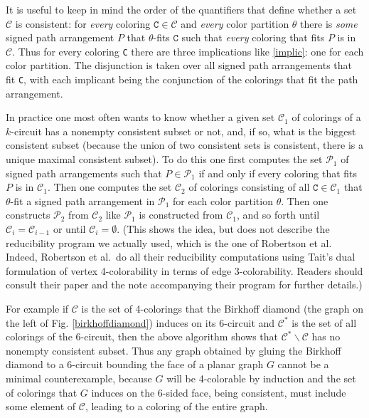 \documentclass[11pt]{article}
\newcommand{\mcal}{\mathcal}
\newcommand{\back}{\backslash}
\newcommand{\rC}{\texttt{C}}
\begin{document}
It is useful to keep in mind the order of the quantifiers that define whether a set $\mcal{C}$ is consistent: for \emph{every} coloring $\rC \in \mcal{C}$ and \emph{every} color partition $\theta$ there is \emph{some} signed path arrangement $P$ that $\theta$-fits $\rC$ such that \emph{every} coloring that fits $P$ is in $\mcal{C}$. Thus for every coloring \rC{} there are three implications like \eqref{implic}: one for each color partition. The disjunction is taken over all signed path arrangements that fit \rC, with each implicant being the conjunction of the colorings that fit the path arrangement.

In practice one most often wants to know whether a given set $\mcal{C}_1$ of colorings of a $k$-circuit has a nonempty consistent subset or not, and, if so, what is the biggest consistent subset (because the union of two consistent sets is consistent, there is a unique maximal consistent subset). To do this one first computes the set $\mcal{P}_1$ of signed path arrangements such that $P \in \mcal{P}_1$ if and only if every coloring that fits $P$ is in $\mcal{C}_1$. Then one computes the set $\mcal{C}_2$ of colorings 
consisting of all $\rC \in \mcal{C}_1$ 
that $\theta$-fit a signed path arrangement in $\mcal{P}_1$ for each color partition $\theta$. Then one constructs $\mcal{P}_2$ from $\mcal{C}_2$ like $\mcal{P}_1$ is constructed from $\mcal{C}_1$, and so forth until $\mcal{C}_i = \mcal{C}_{i-1}$ or until $\mcal{C}_i = \emptyset$. (This shows the idea, but does not describe the reducibility program we actually used, which is the one of Robertson et al. Indeed, Robertson et al.~do all their reducibility computations using Tait's dual formulation of vertex 4-colorability in terms of edge 3-colorability. Readers should consult their paper and the note accompanying their program \cite{reduce} for further details.)

For example if $\mcal{C}$ is the set of 4-colorings that the Birkhoff diamond (the graph on the left of Fig$.$ \ref{birkhoffdiamond}) induces on its 6-circuit and 
$\mcal{C}^*$ is the set of all colorings of the 6-circuit, then the above algorithm shows that $\mcal{C}^*\back \mcal{C}$ has no nonempty consistent subset. Thus any graph obtained by gluing the Birkhoff diamond to
a 6-circuit bounding the face 
 of a planar graph $G$ cannot be a minimal counterexample, because $G$ will be 4-colorable by induction and the set of colorings that $G$ induces on the 6-sided face, being consistent, must include some element of $\mcal{C}$, leading to a coloring of the entire graph. 
\end{document}
